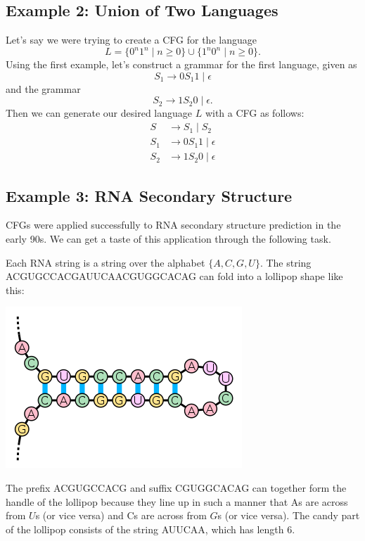 \documentclass{article}
\begin{document}
    \subsection*{Example 2: Union of Two Languages}
    Let's say we were trying to create a CFG for the language $$L = \{0^{n}1^{n} \mid n \ge 0\} \cup \{1^{n}0^{n} \mid n \ge 0\}.$$ Using the first example, let's construct a grammar for the first language, given as $$S_{1} \rightarrow 0S_{1}1 \mid \epsilon$$ and the grammar $$S_{2} \rightarrow 1S_{2}0 \mid \epsilon.$$ Then we can generate our desired language $L$ with a CFG as follows:
    \begin{align*}
        S &\rightarrow S_{1} \mid S_{2} \\
        S_{1} &\rightarrow 0S_{1}1 \mid \epsilon \\
        S_{2} &\rightarrow 1S_{2}0 \mid \epsilon
    \end{align*}

\subsection*{Example 3: RNA Secondary Structure}
        CFGs were applied successfully to RNA secondary structure prediction in the early 90s. We can get a taste of this application through the following task.
        
        Each RNA string is a string over the alphabet $\{A, C, G, U\}$. The string ACGUGCCACGAUUCAACGUGGCACAG can fold into a lollipop shape like this:
        \begin{center}
            \includegraphics[scale = 0.4]{stem-loop.png}
        \end{center}
        \qquad The prefix ACGUGCCACG and suffix CGUGGCACAG can together form the handle of the lollipop because they line up in such a manner that As are across from $U$s (or vice versa) and Cs are across from $G$s (or vice versa). The candy part of the lollipop consists of the string AUUCAA, which has length 6.
\end{document}
